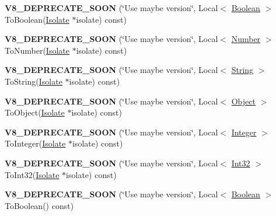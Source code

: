 \begin{DoxyCompactItemize}
{\bfseries V8\+\_\+\+D\+E\+P\+R\+E\+C\+A\+T\+E\+\_\+\+S\+O\+ON} (\char`\"{}Use maybe version\char`\"{}, Local$<$ \mbox{\hyperlink{classv8_1_1Boolean}{Boolean}} $>$ To\+Boolean(\mbox{\hyperlink{classv8_1_1Isolate}{Isolate}} $\ast$isolate) const)
\item 
\mbox{\label{classv8_1_1Value_a855a0b74584b9c322c04891783f37e9c}} 
{\bfseries V8\+\_\+\+D\+E\+P\+R\+E\+C\+A\+T\+E\+\_\+\+S\+O\+ON} (\char`\"{}Use maybe version\char`\"{}, Local$<$ \mbox{\hyperlink{classv8_1_1Number}{Number}} $>$ To\+Number(\mbox{\hyperlink{classv8_1_1Isolate}{Isolate}} $\ast$isolate) const)
\item 
\mbox{\label{classv8_1_1Value_a898f773c591e760fcb98e99cccff3e5c}} 
{\bfseries V8\+\_\+\+D\+E\+P\+R\+E\+C\+A\+T\+E\+\_\+\+S\+O\+ON} (\char`\"{}Use maybe version\char`\"{}, Local$<$ \mbox{\hyperlink{classv8_1_1String}{String}} $>$ To\+String(\mbox{\hyperlink{classv8_1_1Isolate}{Isolate}} $\ast$isolate) const)
\item 
\mbox{\label{classv8_1_1Value_a4c98939a72d6c48b01c8279cfe218d34}} 
{\bfseries V8\+\_\+\+D\+E\+P\+R\+E\+C\+A\+T\+E\+\_\+\+S\+O\+ON} (\char`\"{}Use maybe version\char`\"{}, Local$<$ \mbox{\hyperlink{classv8_1_1Object}{Object}} $>$ To\+Object(\mbox{\hyperlink{classv8_1_1Isolate}{Isolate}} $\ast$isolate) const)
\item 
\mbox{\label{classv8_1_1Value_aae926c4392edf0ad4a5383ab0d8af4b1}} 
{\bfseries V8\+\_\+\+D\+E\+P\+R\+E\+C\+A\+T\+E\+\_\+\+S\+O\+ON} (\char`\"{}Use maybe version\char`\"{}, Local$<$ \mbox{\hyperlink{classv8_1_1Integer}{Integer}} $>$ To\+Integer(\mbox{\hyperlink{classv8_1_1Isolate}{Isolate}} $\ast$isolate) const)
\item 
\mbox{\label{classv8_1_1Value_abf72660ee84f81fe2fed85e39e6a3c86}} 
{\bfseries V8\+\_\+\+D\+E\+P\+R\+E\+C\+A\+T\+E\+\_\+\+S\+O\+ON} (\char`\"{}Use maybe version\char`\"{}, Local$<$ \mbox{\hyperlink{classv8_1_1Int32}{Int32}} $>$ To\+Int32(\mbox{\hyperlink{classv8_1_1Isolate}{Isolate}} $\ast$isolate) const)
\item 
\mbox{\label{classv8_1_1Value_a4c9960d9a42b62b83d70ade47d88fa52}} 
{\bfseries V8\+\_\+\+D\+E\+P\+R\+E\+C\+A\+T\+E\+\_\+\+S\+O\+ON} (\char`\"{}Use maybe version\char`\"{}, Local$<$ \mbox{\hyperlink{classv8_1_1Boolean}{Boolean}} $>$ To\+Boolean() const)

\end{DoxyCompactItemize}
